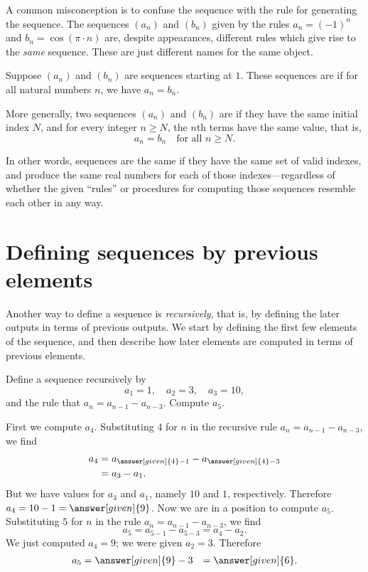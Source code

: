\documentclass{ximera}
\begin{document}
\begin{warning}
  A common misconception is to confuse the sequence with the rule for
  generating the sequence.  The sequences $(a_n)$ and $(b_n)$ given by
  the rules $a_n = (-1)^n$ and $b_n = \cos (\pi \cdot n)$ are, despite
  appearances, different rules which give rise to the \textit{same}
  sequence.  These are just different names for the same object.
\end{warning}

\begin{definition}
  Suppose $(a_n)$ and $(b_n)$ are sequences starting at $1$.  These
  sequences are  if for all
  natural numbers $n$, we have $a_n = b_n$.

  More generally, two sequences $(a_n)$ and $(b_n)$ are
   if they have the same initial index $N$, and for
  every integer $n \geq N$, the $n$th terms have the same value, that is,
  \[
  a_n = b_n \quad \text{for all $n \geq N$.}
  \]
\end{definition}
In other words, sequences are the same if they have the same set of
valid indexes, and produce the same real numbers for each of those
indexes---regardless of whether the given ``rules'' or procedures for
computing those sequences resemble each other in any way.





\section{Defining sequences by previous elements}


Another way to define a sequence is \textit{recursively},
that is, by defining the later outputs in terms of previous outputs.
We start by defining the first few elements of the sequence, and then
describe how later elements are computed in terms of previous
elements.

\begin{example}
Define a sequence recursively by
\[
a_1 = 1, \quad a_2 = 3, \quad a_3 = 10,
\]
and the rule that $a_n = a_{n-1} - a_{n-3}$.  Compute $a_5$.
\begin{explanation}
  First we compute $a_4$.  Substituting $4$ for $n$ in the recursive
  rule $a_n = a_{n-1} - a_{n-3}$, we find
  \begin{align*}
  a_4 &= a_{\answer[given]{4}-1} - a_{\answer[given]{4}-3} \\
  &= a_3 - a_1.
  \end{align*}
  But we have values for $a_3$ and $a_1$, namely $10$ and $1$,
  respectively.  Therefore $a_4 = 10 - 1 = \answer[given]{9}$.  Now we
  are in a position to compute $a_5$.  Substituting $5$ for $n$ in the
  rule $a_n = a_{n-1} - a_{n-3}$, we find
  \[
  a_5 = a_{5-1} - a_{5-3} = a_4 - a_2.
  \]
  We just computed $a_4 = 9$; we were given $a_2 = 3$.  Therefore
  \begin{align*}
    a_5&= \answer[given]{9} - 3
    &= \answer[given]{6}.
  \end{align*}
\end{explanation}
\end{example}
\end{document}
